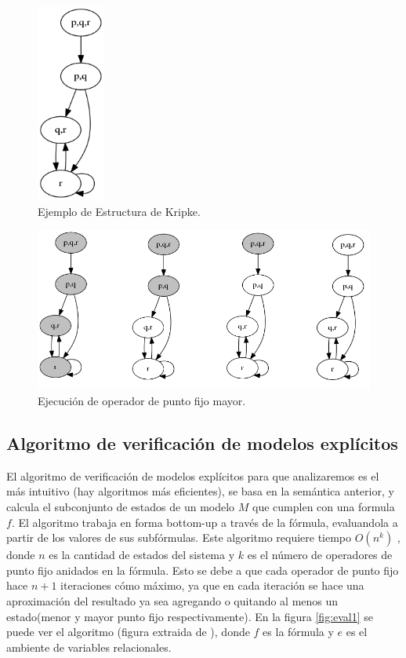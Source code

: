 \begin{figure}[h!]
  \centering
  \includegraphics[width=0.2\textwidth]{Figures/kripke3.png}
  \caption{Ejemplo de Estructura de Kripke.} 
  \label{fig:kripke3}
\end{figure}
\begin{figure}[H]
  \centering
  \includegraphics[width=1\textwidth]{Figures/kripke3-gfp1.png}
  \caption{Ejecución de operador de punto fijo mayor.} 
  \label{fig:kripke3-gfp1}
\end{figure}

\subsection{Algoritmo de verificación de modelos explícitos}

El algoritmo de verificación de modelos explícitos para {\mucalculo} que analizaremos es el más intuitivo (hay algoritmos más eficientes), se basa en la semántica anterior, y calcula el subconjunto de estados de un modelo $M$ que cumplen con una formula $f$. El algoritmo trabaja en forma bottom-up a través de la fórmula, evaluandola a partir de los valores de sus subfórmulas. Este algoritmo requiere tiempo $O(n^{k})$ \cite{Clarke:1}, donde $n$ es la cantidad de estados del sistema y $k$ es el número de operadores de punto fijo anidados en la fórmula. Esto se debe a que cada operador de punto fijo hace $n+1$ iteraciones cómo máximo, ya que en cada iteración se hace una aproximación del resultado ya sea agregando o quitando al menos un estado(menor y mayor punto fijo respectivamente). En la figura \ref{fig:eval1} se puede ver el algoritmo (figura extraida de \cite{Clarke:1}), donde $f$ es la fórmula y $e$ es el ambiente de variables relacionales.

